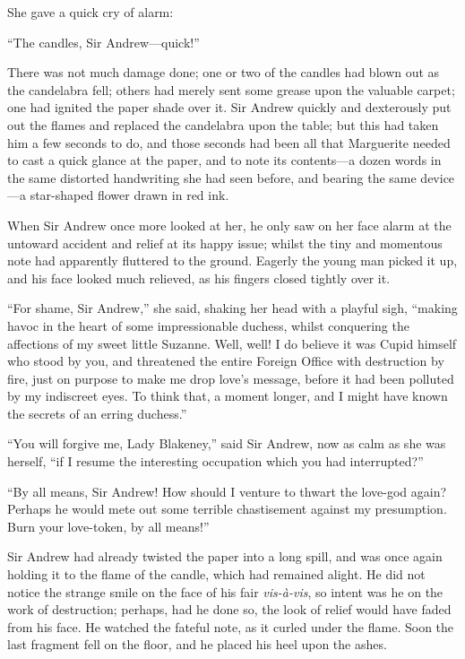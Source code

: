 \documentclass[paper=a5,BCOR=7mm,twoside,DIV=calc,12pt,usegeometry,chapterprefix,endperiod,headings=big]{scrbook}
\begin{document}
She gave a quick cry of alarm:

\enquote{The candles, Sir Andrew---quick!}

There was not much damage done; one or two of the candles had blown out as the candelabra fell; others had merely sent some grease upon the valuable carpet; one had ignited the paper shade over it. Sir Andrew quickly and dexterously put out the flames and replaced the candelabra upon the table; but this had taken him a few seconds to do, and those seconds had been all that Marguerite needed to cast a quick glance at the paper, and to note its contents---a dozen words in the same distorted handwriting she had seen before, and bearing the same device---a star-shaped flower drawn in red ink.

When Sir Andrew once more looked at her, he only saw on her face alarm at the untoward accident and relief at its happy issue; whilst the tiny and momentous note had apparently fluttered to the ground. Eagerly the young man picked it up, and his face looked much relieved, as his fingers closed tightly over it.

\enquote{For shame, Sir Andrew,} she said, shaking her head with a playful sigh, \enquote{making havoc in the heart of some impressionable duchess, whilst conquering the affections of my sweet little Suzanne. Well, well! I do believe it was Cupid himself who stood by you, and threatened the entire Foreign Office with destruction by fire, just on purpose to make me drop love's message, before it had been polluted by my indiscreet eyes. To think that, a moment longer, and I might have known the secrets of an erring duchess.}

\enquote{You will forgive me, Lady Blakeney,} said Sir Andrew, now as calm as she was herself, \enquote{if I resume the interesting occupation which you had interrupted?}

\enquote{By all means, Sir Andrew! How should I venture to thwart the love-god again? Perhaps he would mete out some terrible chastisement against my presumption. Burn your love-token, by all means!}

Sir Andrew had already twisted the paper into a long spill, and was once again holding it to the flame of the candle, which had remained alight. He did not notice the strange smile on the face of his fair \textit{vis-à-vis}, so intent was he on the work of destruction; perhaps, had he done so, the look of relief would have faded from his face. He watched the fateful note, as it curled under the flame. Soon the last fragment fell on the floor, and he placed his heel upon the ashes.
\end{document}

